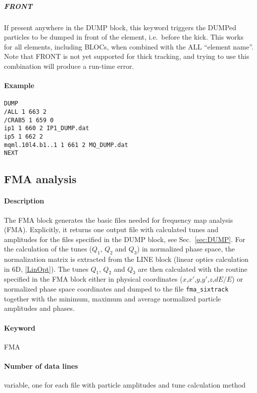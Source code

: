 \documentclass[a4paper,11pt]{report}
\begin{document}
\subparagraph{FRONT} If present anywhere in the DUMP block, this keyword triggers the DUMPed particles to be dumped in front of the element, i.e.\ before the kick.
This works for all elements, including BLOCs, when combined with the ALL ``element name''.
Note that FRONT is not yet supported for thick tracking, and trying to use this combination will produce a run-time error.

\paragraph{Example}
\begin{verbatim}
DUMP
/ALL 1 663 2
/CRAB5 1 659 0
ip1 1 660 2 IP1_DUMP.dat
ip5 1 662 2
mqml.10l4.b1..1 1 661 2 MQ_DUMP.dat
NEXT
\end{verbatim}

\subsection{FMA analysis} \label{sec:FMA}

\paragraph{Description}
The FMA block generates the basic files needed for frequency map analysis (FMA). Explicitly, it returns one output file with calculated tunes and amplitudes for the files specified in the DUMP block, see Sec.~\ref{sec:DUMP}. For the calculation of the tunes ($Q_1$, $Q_2$ and $Q_3$) in normalized phase space, the normalization matrix is extracted from the LINE block (linear optics calculation in 6D, \ref{LinOpt}). The tunes $Q_1$, $Q_2$ and $Q_3$ are then calculated with the routine specified in the FMA block either in physical coordinates ($x$,$x'$,$y$,$y'$,$z$,$dE/E$) or normalized phase space coordinates and dumped to the file \verb|fma_sixtrack| together with the minimum, maximum and average normalized particle amplitudes and phases. 

\paragraph{Keyword}
FMA

\paragraph{Number of data lines}
variable, one for each file with particle amplitudes and tune calculation method
\end{document}
